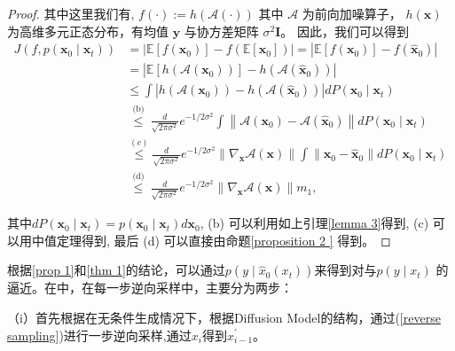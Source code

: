 \begin{theorem}[定理1的证明]
\begin{proof}
其中这里我们有, $f(\cdot):=h(\mathcal{A}(\cdot))$ 其中 $\mathcal{A}$ 为前向加噪算子，  $h(\boldsymbol{x})$ 为高维多元正态分布，有均值 $\boldsymbol{y}$ 与协方差矩阵 $\sigma^2 \boldsymbol{I}$。 因此，我们可以得到
\begin{align}
J\left(f, p\left(\boldsymbol{x}_0 \mid \boldsymbol{x}_t\right)\right) & =\left|\mathbb{E}\left[f\left(\boldsymbol{x}_0\right)\right]-f\left(\mathbb{E}\left[\boldsymbol{x}_0\right]\right)\right|=\left|\mathbb{E}\left[f\left(\boldsymbol{x}_0\right)\right]-f\left(\hat{\boldsymbol{x}}_0\right)\right| \\
& =\left|\mathbb{E}\left[h\left(\mathcal{A}\left(\boldsymbol{x}_0\right)\right)\right]-h\left(\mathcal{A}\left(\hat{\boldsymbol{x}}_0\right)\right)\right| \\
& \leq \int\left|h\left(\mathcal{A}\left(\boldsymbol{x}_0\right)\right)-h\left(\mathcal{A}\left(\hat{\boldsymbol{x}}_0\right)\right)\right| d P\left(\boldsymbol{x}_0 \mid \boldsymbol{x}_t\right) \\
& \stackrel{\text { (b) }}{\leq} \frac{d}{\sqrt{2 \pi \sigma^2}} e^{-1 / 2 \sigma^2} \int\left\|\mathcal{A}\left(\boldsymbol{x}_0\right)-\mathcal{A}\left(\hat{\boldsymbol{x}}_0\right)\right\| d P\left(\boldsymbol{x}_0 \mid \boldsymbol{x}_t\right) \\
& \stackrel{(c)}{\leq} \frac{d}{\sqrt{2 \pi \sigma^2}} e^{-1 / 2 \sigma^2}\left\|\nabla_{\boldsymbol{x}} \mathcal{A}(\boldsymbol{x})\right\| \int\left\|\boldsymbol{x}_0-\hat{\boldsymbol{x}}_0\right\| d P\left(\boldsymbol{x}_0 \mid \boldsymbol{x}_t\right) \\
& \stackrel{\text { (d) }}{\leq} \frac{d}{\sqrt{2 \pi \sigma^2}} e^{-1 / 2 \sigma^2}\left\|\nabla_{\boldsymbol{x}} \mathcal{A}(\boldsymbol{x})\right\| m_1,
\end{align}

其中$d P\left(\boldsymbol{x}_0 \mid \boldsymbol{x}_t\right)=p\left(\boldsymbol{x}_0 \mid \boldsymbol{x}_t\right) d \boldsymbol{x}_0$, (b) 可以利用如上引理\ref{lemma 3}得到, (c) 可以用中值定理得到, 最后 (d) 可以直接由命题\ref{proposition 2 } 得到。 
\end{proof}
\end{theorem}

根据\ref{prop 1}和\ref{thm 1}的结论，可以通过$p(y\mid \hat{x}_0(x_t))$来得到对与$p(y\mid x_t)$
的逼近。在\cite{Inverse}中，在每一步逆向采样中，主要分为两步：   

（i）首先根据在无条件生成情况下，根据Diffusion Model的结构，通过(\ref{reverse sampling})进行一步逆向采样,通过$x_i$得到$x_{i-1}^{\prime}$。    


